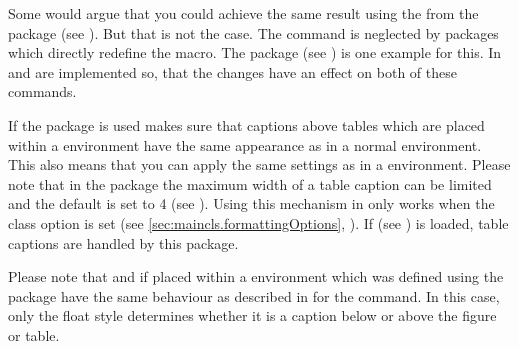 \begin{Explain}
  Some would argue that you could achieve the same result using the
   from the 
  package (see \cite{package:topcapt}). But that
  is  not the case. The command  is neglected by
  packages which directly redefine the  macro. The
   package (see \cite{package:hyperref}) is one example
  for this. In \KOMAScript{}  and
   are implemented so, that the changes have an
  effect on both of these commands.
  
  If the  package is used
  \KOMAScript{} makes sure that captions above tables which are placed within
  a  environment have the same appearance as in a
  normal  environment. This also means that you can apply
  the same settings as in a  environment. Please note that
  in the  package the maximum width of a table caption can
  be limited and the default is set to 4 (see
  \cite{package:longtable}). Using \KOMAScript{} this mechanism in
   only works when the class option 
  is set (see \autoref{sec:maincls.formattingOptions},
  ). If
   (see \cite{package:caption2}) is
  loaded, table captions are handled by this package.
  
  Please note that  and  if placed
  within a  environment which was defined using the
   package have the same behaviour as
  described in \cite{package:float} for the  command.  In this
  case, only the float style determines whether it is a caption below or above
  the figure or table.
\end{Explain}


